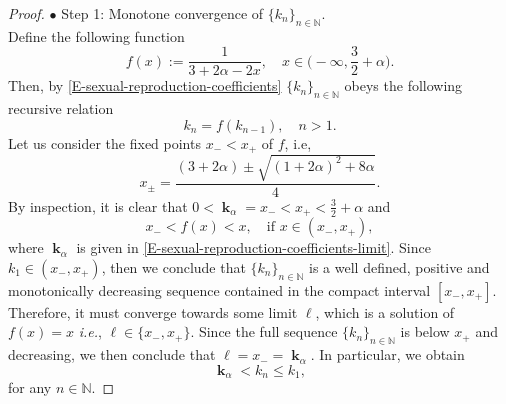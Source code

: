 \documentclass[reqno]{amsart}
\DeclareMathOperator{\bk}{\boldsymbol{k}}
\numberwithin{equation}{section}
\begin{document}
{\begin{proof}
\medskip

$\bullet$ {\sc Step 1}: Monotone convergence of $\{k_n\}_{n\in \mathbb{N}}$.\\
Define the following function
$$f(x):=\frac{1}{3+2\alpha-2x},\quad x\in \big(-\infty,\frac{3}{2}+\alpha\big).$$
Then, by \eqref{E-sexual-reproduction-coefficients} $\{k_n\}_{n\in \mathbb{N}}$ obeys the following recursive relation
$$k_n=f(k_{n-1}),\quad n>1.$$
Let us consider the fixed points $x_-<x_+$ of $f$, i.e,
$$x_{\pm}=\frac{(3+2\alpha)\pm\sqrt{(1+2\alpha)^2+8\alpha}}{4}.$$
By inspection, it is clear that $0<\bk_\alpha=x_-<x_+<\frac{3}{2}+\alpha$ and
$$
x_-<f(x)<x, \quad \text{if }x\in (x_-,x_+),
$$
where $\bk_\alpha$ is given in \eqref{E-sexual-reproduction-coefficients-limit}. Since $k_1\in (x_-,x_+)$, then we conclude that $\{k_n\}_{n\in \mathbb{N}}$ is a well defined, positive and monotonically decreasing sequence contained in the compact interval $[x_-,x_+]$. Therefore, it must converge towards some limit $\ell$, which is a solution of $f(x)=x$ {\em i.e.}, $\ell\in \{x_-,x_+\}$. Since the full sequence $\{k_n\}_{n\in \mathbb{N}}$ is below $x_+$ and decreasing, we then conclude that $\ell=x_-=\bk_\alpha$. In particular, we obtain
\begin{equation}\label{E-contraction-coefficients-uniform-bound}
\bk_\alpha<k_n\leq k_1,
\end{equation}
for any $n\in \mathbb{N}$.

\medskip


\end{proof}}
\end{document}
